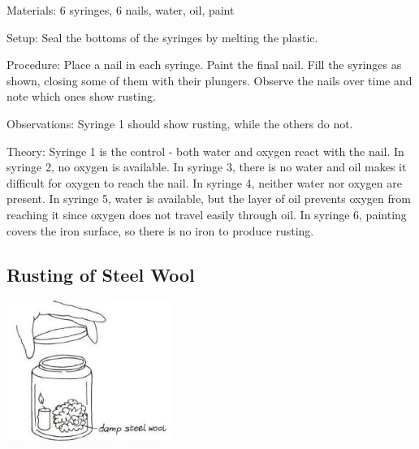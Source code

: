 \begin{multicols}{2}
\begin{description*}
\item[Materials:]{6 syringes, 6 nails, water, oil, paint}
\item[Setup:]{Seal the bottoms of the syringes by melting the plastic.}
\item[Procedure:]{Place a nail in each syringe. Paint the final nail. Fill the syringes as shown, closing some of them with their plungers. Observe the nails over time and note which ones show rusting.}
\item[Observations:]{Syringe 1 should show rusting, while the others do not.}
\item[Theory:]{Syringe 1 is the control - both water and oxygen react with the nail. In syringe 2, no oxygen is available. In syringe 3, there is no water and oil makes it difficult for oxygen to reach the nail. In syringe 4, neither water nor oxygen are present. In syringe 5, water is available, but the layer of oil prevents oxygen from reaching it since oxygen does not travel easily through oil. In syringe 6, painting covers the iron surface, so there is no iron to produce rusting.}
\end{description*}

\subsection{Rusting of Steel Wool} %

\begin{center}
\includegraphics[width=0.4\textwidth]{./img/vso/rusting-steel-wool.jpg}
\end{center}


\end{multicols}
